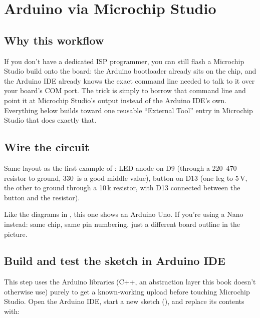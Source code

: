 
\section{Arduino via Microchip Studio}
\label{c2:sec:studio}\label{c2:app:c}

\subsection{Why this workflow}
\label{c2:c:1}
If you don't have a dedicated ISP programmer, you can still flash a Microchip Studio build onto the
board: the Arduino bootloader already sits on the chip, and the Arduino IDE already knows the exact
 command line needed to talk to it over your board's COM port. The trick is simply to
borrow that command line and point it at Microchip Studio's  output instead of the
Arduino IDE's own. Everything below builds toward one reusable ``External Tool'' entry in Microchip
Studio that does exactly that.

\subsection{Wire the circuit}
\label{c2:c:2}
Same layout as the first example of : LED anode on D9 (through a
220--470\,\textohm{} resistor to ground, 330\,\textohm{} is a good middle value), button on D13
(one leg to 5\,V, the other to ground through a 10\,k\textohm{} resistor, with D13 connected
between the button and the resistor).


\noindent Like the diagrams in , this one shows an Arduino Uno. If you're using a
Nano instead: same chip, same pin numbering, just a different board outline in the picture.

\subsection{Build and test the sketch in Arduino IDE}
\label{c2:c:3}
This step uses the Arduino libraries (C++, an abstraction layer this book doesn't otherwise use)
purely to get a known-working upload before touching Microchip Studio. Open the Arduino IDE, start
a new sketch (), and replace its contents with:


